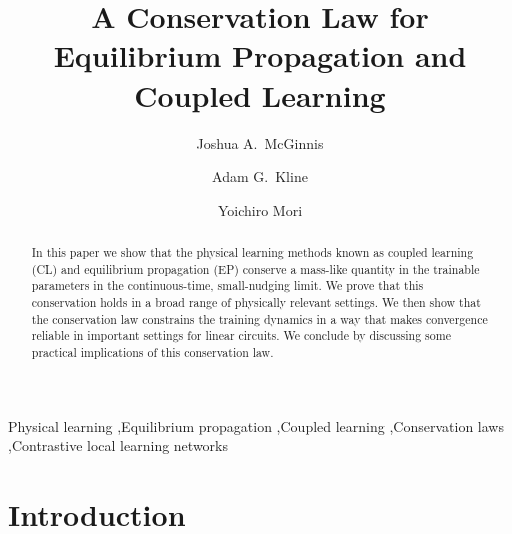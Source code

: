 \documentclass[final, 11pt, nonatbib]{elsarticle}
\theoremstyle{definition}
\theoremstyle{plain}
\numberwithin{equation}{section}
\begin{document}
\begin{frontmatter}

\title{A Conservation Law for Equilibrium Propagation and Coupled Learning}

\author[penn-math]{Joshua A.\ McGinnis}
\author[penn-physics]{Adam G.\ Kline}
\author[penn-math,penn-bio]{Yoichiro Mori}



\begin{abstract}
In this paper we show that the physical learning methods known as coupled learning (CL) and equilibrium propagation (EP) conserve a mass-like quantity in the trainable parameters in the continuous-time, small-nudging limit. We prove that this conservation holds in a broad range of physically relevant settings. We then show that the conservation law constrains the training dynamics in a way that makes convergence reliable in important settings for linear circuits. We conclude by discussing some practical implications of this conservation law. 
\end{abstract}

\begin{keyword}
Physical learning \sep Equilibrium propagation \sep Coupled learning \sep Conservation laws \sep Contrastive local learning networks
\end{keyword}

\end{frontmatter}


\section{Introduction}
\end{document}
